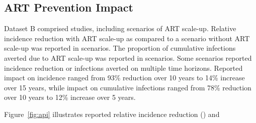 \subsection{ART Prevention Impact}
\label{ss:res:api}
Dataset B comprised  studies,
including  scenarios of ART scale-up.
Relative incidence reduction with ART scale-up
as compared to a scenario without ART scale-up
was reported in  scenarios.
The proportion of cumulative infections averted due to ART scale-up
was reported in  scenarios.
Some scenarios reported incidence reduction or infections averted
on multiple time horizons. %
Reported impact on incidence ranged from %
93\% reduction over 10 years\cite{Granich2009} to
14\% increase over 15 years,\cite{Salomon2005}
while impact on cumulative infections ranged from
78\% reduction over 10 years\cite{Abbas2006} to
12\% increase over 5 years.\cite{Barnighausen2016}
\par
Figure~\ref{fig:api} illustrates reported
relative incidence reduction () and
